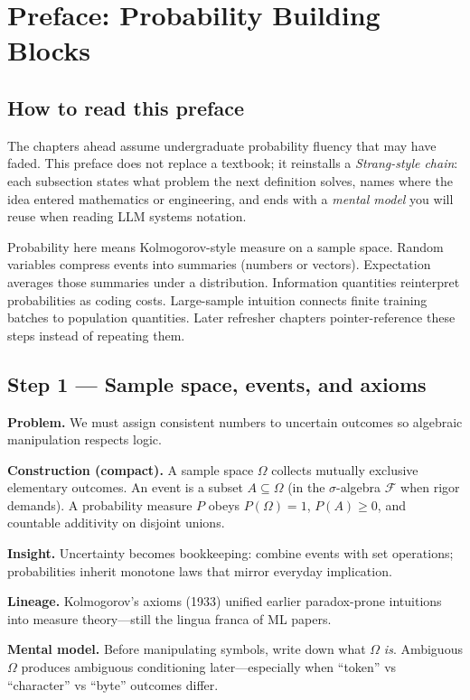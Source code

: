 \chapter*{Preface: Probability Building Blocks}

\section*{How to read this preface}
The chapters ahead assume undergraduate probability fluency that may have faded. This preface does not replace a textbook; it reinstalls a \emph{Strang-style chain}: each subsection states what problem the next definition solves, names where the idea entered mathematics or engineering, and ends with a \emph{mental model} you will reuse when reading LLM systems notation.

Probability here means Kolmogorov-style measure on a sample space. Random variables compress events into summaries (numbers or vectors). Expectation averages those summaries under a distribution. Information quantities reinterpret probabilities as coding costs. Large-sample intuition connects finite training batches to population quantities. Later refresher chapters pointer-reference these steps instead of repeating them.

\section*{Step 1 --- Sample space, events, and axioms}
\textbf{Problem.} We must assign consistent numbers to uncertain outcomes so algebraic manipulation respects logic.

\textbf{Construction (compact).} A sample space $\Omega$ collects mutually exclusive elementary outcomes. An event is a subset $A\subseteq\Omega$ (in the $\sigma$-algebra $\mathcal{F}$ when rigor demands). A probability measure $P$ obeys $P(\Omega)=1$, $P(A)\ge 0$, and countable additivity on disjoint unions.

\textbf{Insight.} Uncertainty becomes bookkeeping: combine events with set operations; probabilities inherit monotone laws that mirror everyday implication.

\textbf{Lineage.} Kolmogorov's axioms (1933) unified earlier paradox-prone intuitions into measure theory---still the lingua franca of ML papers.

\textbf{Mental model.} Before manipulating symbols, write down what $\Omega$ \emph{is}. Ambiguous $\Omega$ produces ambiguous conditioning later---especially when ``token'' vs ``character'' vs ``byte'' outcomes differ.

